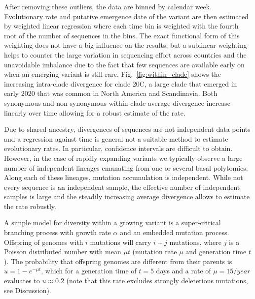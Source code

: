 \documentclass[aps,rmp, twocolumn]{revtex4}
\begin{document}
After removing these outliers, the data are binned by calendar week.
Evolutionary rate and putative emergence date of the variant are then estimated by weighted linear regression where each time bin is weighted with the fourth root of the number of sequences in the bins.
The exact functional form of this weighting does not have a big influence on the results, but a sublinear weighting helps to counter the large variation in sequencing effort across countries and the unavoidable imbalance due to the fact that few sequences are available early on when an emerging variant is still rare.
Fig.~\ref{fig:within_clade} shows the increasing intra-clade divergence for clade 20C, a large clade that emerged in early 2020 that was common in North America and Scandinavia.
Both synonymous and non-synonymous within-clade average divergence increase linearly over time allowing for a robust estimate of the rate.

Due to shared ancestry, divergences of sequences are not independent data points and a regression against time is general not a suitable method to estimate evolutionary rates.
In particular, confidence intervals are difficult to obtain.
However, in the case of rapidly expanding variants we typically observe a large number of independent lineages emanating from one or several basal polytomies.
Along each of these lineages, mutation accumulation is independent.
While not every sequence is an independent sample, the effective number of independent samples is large and the steadily increasing average divergence allows to estimate the rate robustly.

A simple model for diversity within a growing variant is a super-critical branching process with growth rate $\alpha$ and an embedded mutation process.
Offspring of genomes with $i$ mutations will carry $i+j$ mutations, where $j$ is a Poisson distributed number with mean $\mu t$ (mutation rate $\mu$ and generation time $t$).
The probability that offspring genomes are different from their parents is $u = 1-e^{-\mu t}$, which for a generation time of $t=5$ days and a rate of $\mu = 15/year$ evaluates to $u\approx 0.2$ (note that this rate excludes strongly deleterious mutations, see Discussion).
\end{document}
